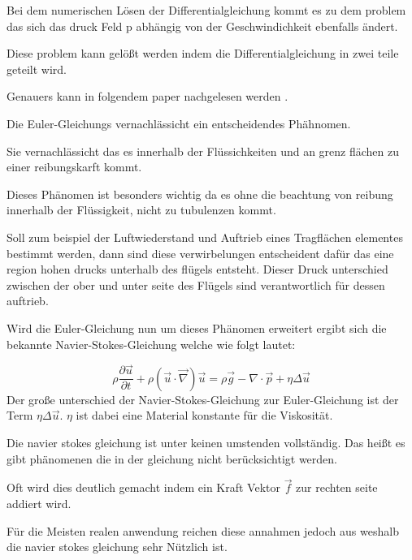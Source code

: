 Bei dem numerischen Lösen der Differentialgleichung kommt es zu dem problem das sich das druck Feld p
abhängig von der Geschwindichkeit ebenfalls ändert.

Diese problem kann gelößt werden indem die Differentialgleichung in zwei teile geteilt wird.

Genauers kann in folgendem paper nachgelesen werden \cite{}.

Die Euler-Gleichungs vernachlässicht ein entscheidendes Phähnomen.

Sie vernachlässicht das es innerhalb der Flüssichkeiten und an grenz flächen zu einer reibungskarft kommt.


Dieses Phänomen ist besonders wichtig da es ohne die beachtung von reibung innerhalb der Flüssigkeit,
nicht zu tubulenzen kommt.

Soll zum beispiel der Luftwiederstand und Auftrieb eines Tragflächen elementes bestimmt werden,
dann sind diese verwirbelungen entscheident dafür das eine region hohen drucks unterhalb des flügels entsteht.
Dieser Druck unterschied zwischen der ober und unter seite des Flügels sind verantwortlich für dessen auftrieb.

Wird die Euler-Gleichung nun um dieses Phänomen erweitert ergibt sich die bekannte Navier-Stokes-Gleichung 
welche wie folgt lautet:

$$
\rho \frac{\partial \vec{u}}{\partial t} + \rho (\vec{u} \cdot \vec{\nabla} ) \vec{u} = 
\rho \vec{g} - \nabla \cdot \vec{p} + \eta \Delta \vec{u}
$$
Der große unterschied der Navier-Stokes-Gleichung zur Euler-Gleichung ist der Term $\eta \Delta \vec{u}$.
$\eta$ ist dabei eine Material konstante für die Viskosität.

Die navier stokes gleichung ist unter keinen umstenden vollständig.
Das heißt es gibt phänomenen die in der gleichung nicht berücksichtigt werden.

Oft wird dies deutlich gemacht indem ein Kraft Vektor $\vec{f}$ zur rechten seite addiert wird.

Für die Meisten realen anwendung reichen diese annahmen jedoch aus weshalb die navier stokes gleichung sehr Nützlich ist.








